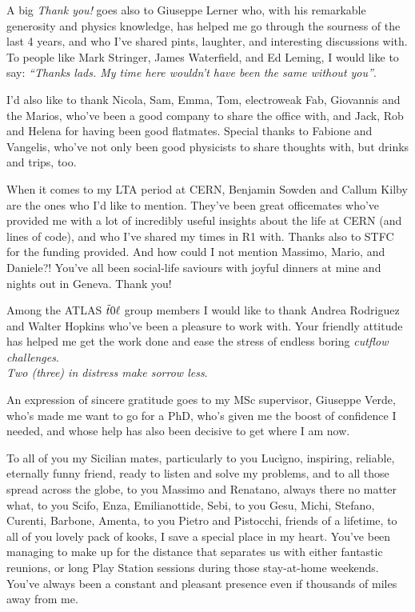 A big \emph{Thank you!} goes also to Giuseppe Lerner who, with his remarkable generosity and physics knowledge, has helped me go through the sourness of the last 4 years, and who I've shared pints, laughter, and interesting discussions with. To people like Mark Stringer, James Waterfield, and Ed Leming, I would like to say: \emph{``Thanks lads. My time here wouldn't have been the same without you''}.

I'd also like to thank Nicola, Sam, Emma, Tom, electroweak Fab, Giovannis and the Marios, who've been a good company to share the office with, and Jack, Rob and Helena for having been good flatmates. Special thanks to Fabione and Vangelis, who've not only been good physicists to share thoughts with, but drinks and trips, too.

When it comes to my \textsc{LTA} period at \textsc{CERN}, Benjamin Sowden and Callum Kilby are the ones who I'd like to mention. They've been great officemates who've provided me with a lot of incredibly useful insights about the life at \textsc{CERN} (and lines of code), and who I've shared my times in \textsc{R1} with. Thanks also to STFC for the funding provided. And how could I not mention Massimo, Mario, and Daniele?! You've all been social-life saviours with joyful dinners at mine and nights out in Geneva. Thank you! 

Among the \textsc{ATLAS} $\tilde{t}0\ell$ group members I would like to thank Andrea Rodriguez and Walter Hopkins who've been a pleasure to work with. Your friendly attitude has helped me get the work done and ease the stress of endless boring \emph{cutflow challenges}.\\\emph{Two (three) in distress make sorrow less}.

An expression of sincere gratitude goes to my MSc supervisor, Giuseppe Verde, who's made me want to go for a PhD, who's given me the boost of confidence I needed, and whose help has also been decisive to get where I am now. 

To all of you my Sicilian mates, particularly to you Lucìgno, inspiring, reliable, eternally funny friend, ready to listen and solve my problems, and to all those spread across the globe, to you Massimo and Renatano, always there no matter what, to you Scifo, Enza, Emilianottide, Sebi, to you Gesu, Michi, Stefano, Curenti, Barbone, Amenta, to you Pietro and Pistocchi, friends of a lifetime, to all of you lovely pack of kooks, I save a special place in my heart. You've been managing to make up for the distance that separates us with either fantastic reunions, or long Play Station sessions during those stay-at-home weekends. You've always been a constant and pleasant presence even if thousands of miles away from me.

